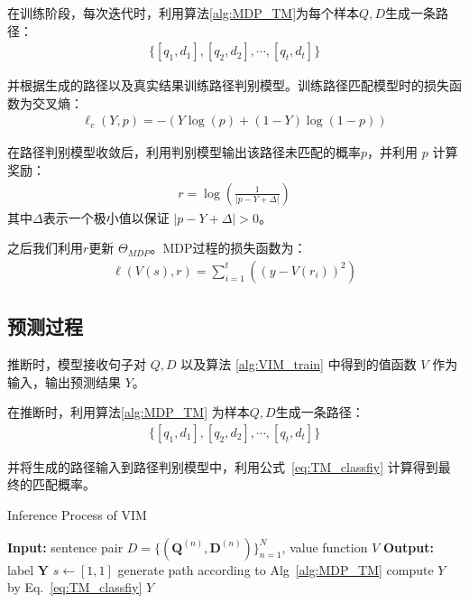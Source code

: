 在训练阶段，每次迭代时，利用算法\ref{alg:MDP_TM}为每个样本$Q, D$生成一条路径：
\begin{equation}\label{eq:mdp_path}
	\begin{aligned}
		\{[q_1, d_1], [q_2, d_2], \cdots, [q_t, d_t]\}
	\end{aligned}
\end{equation}

并根据生成的路径以及真实结果训练路径判别模型。训练路径匹配模型时的损失函数为交叉熵：
\begin{equation}\label{eq:classify_model}
	\begin{aligned}
		\ell_c(Y, p) = -(Y\log(p) + (1-Y)\log(1-p))
	\end{aligned}
\end{equation}

在路径判别模型收敛后，利用判别模型输出该路径未匹配的概率$p$，并利用 $p$ 计算奖励：
\begin{equation}\label{eq:reward}
	\begin{aligned}
		r = \log(\frac{1}{|p-Y+\Delta|})
	\end{aligned}
\end{equation}
其中$\Delta$表示一个极小值以保证 $|p-Y+\Delta| > 0$。

之后我们利用$r$更新 $\Theta_{MDP}$。MDP过程的损失函数为：
\begin{equation}\label{eq:MDP_model}
	\begin{aligned}
		\ell(V(s), r) = \sum_{i=1}^t\left((y - V(r_i))^2\right)
	\end{aligned}
\end{equation}



\subsection{预测过程}
推断时，模型接收句子对 $Q, D$ 以及算法 \ref{alg:VIM_train} 中得到的值函数 $V$ 作为输入，输出预测结果 $Y$。

在推断时，利用算法\ref{alg:MDP_TM} 为样本$Q, D$生成一条路径：
\begin{equation}\label{eq:}
	\begin{aligned}
		\{[q_1, d_1], [q_2, d_2], \cdots, [q_t, d_t]\}
	\end{aligned}
\end{equation}

并将生成的路径输入到路径判别模型中，利用公式~\ref{eq:TM_classfiy} 计算得到最终的匹配概率。

\begin{algorithm}[!htbp]
    \small
    \caption{Inference Process of VIM}\label{alg:TM_inf}
    \begin{algorithmic}
        \STATE \textbf{Input:} sentence pair $D=\{ (\mathbf{Q}^{(n)}, \mathbf{D}^{(n)})\}_{n=1}^N$, value function $V$
        \STATE \textbf{Output:} label $\mathbf{Y}$
        \STATE $s \leftarrow [1,1]$
        \STATE generate path according to Alg~\ref{alg:MDP_TM}
        \STATE compute $Y$ by Eq.~\ref{eq:TM_classfiy}
        \STATE \RETURN  $Y$
    \end{algorithmic}
\end{algorithm}

